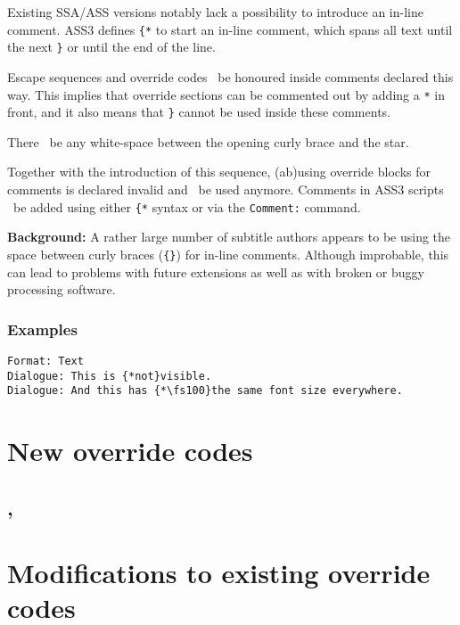 \documentclass{spec}
\begin{document}
Existing SSA/ASS versions notably lack a possibility to introduce an
in-line comment. ASS3 defines \texttt{\{*} to start an in-line comment,
which spans all text until the next \texttt{\}} or until the end of the line.

Escape sequences and override codes \mustnot\ be honoured inside comments
declared this way. This implies that override sections can be commented out by
adding a \texttt{*} in front, and it also means that \texttt{\}} cannot
be used inside these comments.

There \mustnot\ be any white-space between the opening curly brace and the
star.

Together with the introduction of this sequence, (ab)using override blocks
for comments is declared invalid and \mustnot\ be used anymore. Comments in
ASS3 scripts \must\ be added using either \texttt{\{*} syntax or via the
\texttt{Comment:} command.

{\footnotesize
\textbf{Background:} A rather large number of subtitle authors appears to be
using the space between curly braces (\texttt{\{\}}) for in-line comments.
Although improbable, this can lead to problems with future extensions
as well as with broken or buggy processing software.
}

\subsubsection*{Examples}
\begin{verbatim}
Format: Text
Dialogue: This is {*not}visible.
Dialogue: And this has {*\fs100}the same font size everywhere.
\end{verbatim}

\section{New override codes}
\subsection{\todo {}, }

\subsection{\todo {}}

\section{Modifications to existing override codes}
\end{document}

